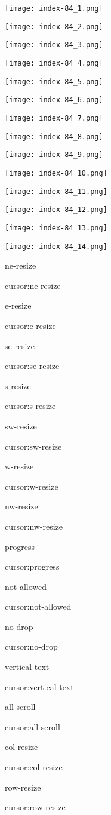 \documentclass[
]{article}
\begin{document}
\protect\hypertarget{index_split_006.htmlux5cux23p84}{}{}\texttt{[image: index-84\_1.png]}

\texttt{[image: index-84\_2.png]}

\texttt{[image: index-84\_3.png]}

\texttt{[image: index-84\_4.png]}

\texttt{[image: index-84\_5.png]}

\texttt{[image: index-84\_6.png]}

\texttt{[image: index-84\_7.png]}

\texttt{[image: index-84\_8.png]}

\texttt{[image: index-84\_9.png]}

\texttt{[image: index-84\_10.png]}

\texttt{[image: index-84\_11.png]}

\texttt{[image: index-84\_12.png]}

\texttt{[image: index-84\_13.png]}

\texttt{[image: index-84\_14.png]}

ne-resize

cursor:ne-resize

e-resize

cursor:e-resize

se-resize

cursor:se-resize

s-resize

cursor:s-resize

sw-resize

cursor:sw-resize

w-resize

cursor:w-resize

nw-resize

cursor:nw-resize

progress

cursor:progress

not-allowed

cursor:not-allowed

no-drop

cursor:no-drop

vertical-text

cursor:vertical-text

all-scroll

cursor:all-scroll

col-resize

cursor:col-resize

row-resize

cursor:row-resize
\end{document}
